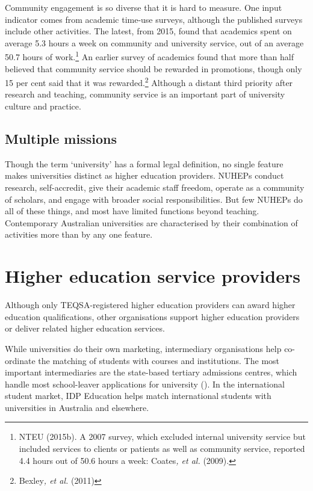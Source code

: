 \documentclass{grattan}
\begin{document}
Community engagement is so diverse that it is hard to measure. One input indicator comes from academic time-use surveys, although the published surveys include other activities. The latest, from 2015, found that academics spent on average 5.3 hours a week on community and university service, out of an average 50.7 hours of work.\footnote{NTEU (2015b). A 2007 survey, which excluded internal university service but included services to clients or patients as well as community service, reported 4.4 hours out of 50.6 hours a week: Coates\emph{, et al.} (2009).} An earlier survey of academics found that more than half believed that community service should be rewarded in promotions, though only 15 per cent said that it was rewarded.\footnote{Bexley\emph{, et al.} (2011)} Although a distant third priority after research and teaching, community service is an important part of university culture and practice.

%
\subsection{Multiple missions}\label{subsec:multiple-missions}

Though the term `university' has a formal legal definition, no single feature makes universities distinct as higher education providers. NUHEPs conduct research, self-accredit, give their academic staff freedom, operate as a community of scholars, and engage with broader social responsibilities. But few NUHEPs do all of these things, and most have limited functions beyond teaching. Contemporary Australian universities are characterised by their combination of activities more than by any one feature.

%
\section{Higher education service providers }\label{sec:higher-education-service-providers}

Although only TEQSA-registered higher education providers can award higher education qualifications, other organisations support higher education providers or deliver related higher education services.

While universities do their own marketing, intermediary organisations help co-ordinate the matching of students with courses and institutions. The most important intermediaries are the state-based tertiary admissions centres, which handle most school-leaver applications for university (). In the international student market, IDP Education helps match international students with universities in Australia and elsewhere.
\end{document}
